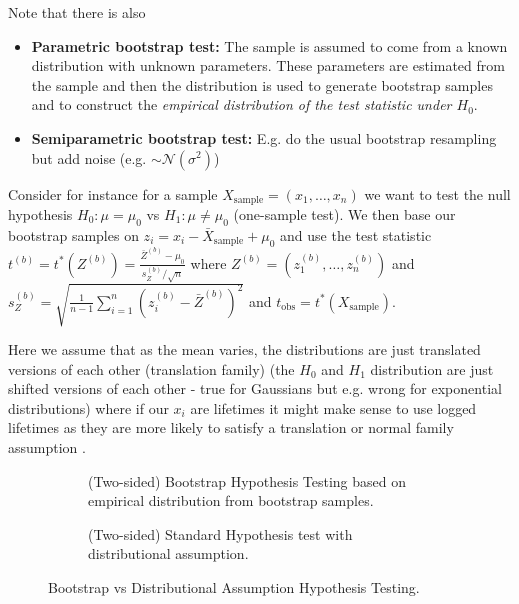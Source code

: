 Note that there is also
\begin{itemize}
    \item \textbf{Parametric bootstrap test:} The sample is assumed to come from a known distribution with unknown parameters. These parameters are estimated from the sample and then the distribution is used to generate bootstrap samples and to construct the \textit{empirical distribution of the test statistic under $H_0$}.
    \item \textbf{Semiparametric bootstrap test:} E.g. do the usual bootstrap resampling but add noise (e.g. $\sim \mathcal{N}(\sigma^2)$)
\end{itemize}

Consider for instance for a sample $X_{\text{sample}} = (x_1,\dots,x_n)$ we want to test the null hypothesis $H_0: \mu = \mu_0$ vs $H_1: \mu \neq \mu_0$ (one-sample test).
We then base our bootstrap samples on $z_i = x_i - \bar{X}_{\text{sample}} + \mu_0$ and use the test statistic $t^{(b)} = t^*\left( Z^{(b)} \right) = \frac{\bar{Z}^{(b)} - \mu_0}{s_Z^{(b)} / \sqrt{n}}$
where $Z^{(b)} = (z_1^{(b)},\dots,z_n^{(b)})$ and $s_Z^{(b)} = \sqrt{\frac{1}{n-1} \sum_{i=1}^{n} \left( z_i^{(b)} - \bar{Z}^{(b)} \right)^2}$
and $t_{\text{obs}} = t^*\left( X_{\text{sample}} \right)$.

Here we assume that as the mean varies, the distributions are just translated versions of each other
(translation family) (the $H_0$ and $H_1$ distribution are just shifted versions of each other -
true for Gaussians but e.g. wrong for exponential distributions) where 
if our $x_i$ are lifetimes it might make sense to use
logged lifetimes as they are more likely to satisfy a translation or normal family
assumption \citep[chapter 16.4]{Efron1994}.

\begin{figure}

    \centering
    \begin{subfigure}{0.8\textwidth}
      \centering
      
      \caption{(Two-sided) Bootstrap Hypothesis Testing based on empirical distribution from bootstrap samples.}
      \label{fig:bootstrap}
    \end{subfigure}%



    \begin{subfigure}{0.8\textwidth}
      \centering
      
      \caption{(Two-sided) Standard Hypothesis test with distributional assumption.}
      \label{fig:distributional_assumptions}
    \end{subfigure}

    \caption{Bootstrap vs Distributional Assumption Hypothesis Testing.}
    \label{fig:tests}

\end{figure}

